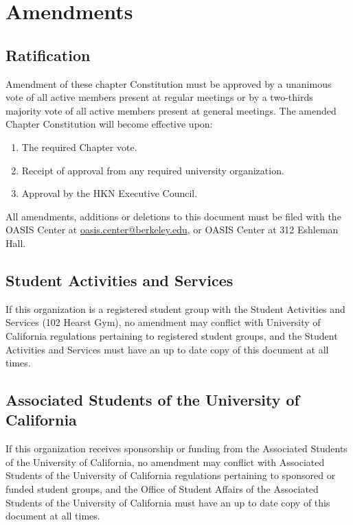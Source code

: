 \documentclass[11pt]{article}
\begin{document}
\section{Amendments}
\label{sec:orgbaa9255}

\subsection{Ratification}
\label{sec:org1269e27}

Amendment of these chapter Constitution must be approved by a unanimous vote of all active members present at regular meetings or by a two-thirds majority vote of all active members present at general meetings.
The amended Chapter Constitution will become effective upon:

\begin{enumerate}
\item The required Chapter vote.
\item Receipt of approval from any required university organization.
\item Approval by the HKN Executive Council.
\end{enumerate}

All amendments, additions or deletions to this document must be filed with the OASIS Center at \href{mailto:oasis.center@berkeley.edu}{oasis.center@berkeley.edu}, or OASIS Center at 312 Eshleman Hall.

\subsection{Student Activities and Services}
\label{sec:org276a1b9}

If this organization is a registered student group with the Student Activities and Services (102 Hearst Gym), no amendment may conflict with University of California regulations pertaining to registered student groups, and the Student Activities and Services must have an up to date copy of this document at all times.

\subsection{Associated Students of the University of California}
\label{sec:org55ada85}

If this organization receives sponsorship or funding from the Associated Students of the University of California, no amendment may conflict with Associated Students of the University of California regulations pertaining to sponsored or funded student groups, and the Office of Student Affairs of the Associated Students of the University of California must have an up to date copy of this document at all times.
\end{document}
